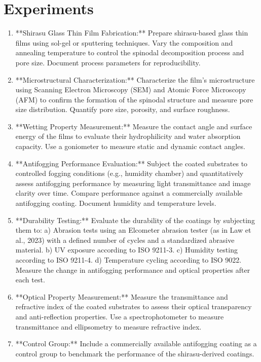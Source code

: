 \documentclass{article}
\begin{document}
\section{Experiments}
\begin{enumerate}
\item **Shirasu Glass Thin Film Fabrication:** Prepare shirasu-based glass thin films using sol-gel or sputtering techniques. Vary the composition and annealing temperature to control the spinodal decomposition process and pore size. Document process parameters for reproducibility.
\item **Microstructural Characterization:** Characterize the film's microstructure using Scanning Electron Microscopy (SEM) and Atomic Force Microscopy (AFM) to confirm the formation of the spinodal structure and measure pore size distribution. Quantify pore size, porosity, and surface roughness.
\item **Wetting Property Measurement:** Measure the contact angle and surface energy of the films to evaluate their hydrophilicity and water absorption capacity. Use a goniometer to measure static and dynamic contact angles.
\item **Antifogging Performance Evaluation:** Subject the coated substrates to controlled fogging conditions (e.g., humidity chamber) and quantitatively assess antifogging performance by measuring light transmittance and image clarity over time. Compare performance against a commercially available antifogging coating. Document humidity and temperature levels.
\item **Durability Testing:** Evaluate the durability of the coatings by subjecting them to: 
 a) Abrasion tests using an Elcometer abrasion tester (as in Law et al., 2023) with a defined number of cycles and a standardized abrasive material.
 b) UV exposure according to ISO 9211-3.
 c) Humidity testing according to ISO 9211-4.
 d) Temperature cycling according to ISO 9022.
Measure the change in antifogging performance and optical properties after each test.
\item **Optical Property Measurement:** Measure the transmittance and refractive index of the coated substrates to assess their optical transparency and anti-reflection properties. Use a spectrophotometer to measure transmittance and ellipsometry to measure refractive index.
\item **Control Group:** Include a commercially available antifogging coating as a control group to benchmark the performance of the shirasu-derived coatings.
\end{enumerate}
\end{document}
